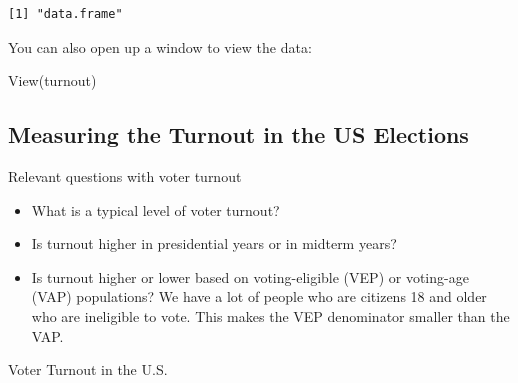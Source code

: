 \documentclass[
  letterpaper,
  DIV=11,
  numbers=noendperiod]{scrreprt}
\newenvironment{Shaded}{\begin{snugshade}}{\end{snugshade}}
\newcommand{\FunctionTok}[1]{\textcolor[rgb]{0.28,0.35,0.67}{#1}}
\newcommand{\NormalTok}[1]{\textcolor[rgb]{0.00,0.23,0.31}{#1}}
\providecommand{\tightlist}{%
  \setlength{\itemsep}{0pt}\setlength{\parskip}{0pt}}\usepackage{longtable,booktabs,array}
\begin{document}
\begin{verbatim}
[1] "data.frame"
\end{verbatim}

You can also open up a window to view the data:

\begin{Shaded}
\begin{Highlighting}[]
\FunctionTok{View}\NormalTok{(turnout)}
\end{Highlighting}
\end{Shaded}

\hypertarget{measuring-the-turnout-in-the-us-elections}{%
\subsection{Measuring the Turnout in the US
Elections}\label{measuring-the-turnout-in-the-us-elections}}

Relevant questions with voter turnout

\begin{itemize}
\tightlist
\item
  What is a typical level of voter turnout?
\item
  Is turnout higher in presidential years or in midterm years?
\item
  Is turnout higher or lower based on voting-eligible (VEP) or
  voting-age (VAP) populations? We have a lot of people who are citizens
  18 and older who are ineligible to vote. This makes the VEP
  denominator smaller than the VAP.
\end{itemize}

Voter Turnout in the U.S.
\end{document}
